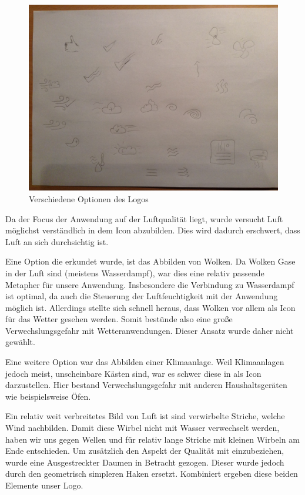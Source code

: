 \documentclass[a4paper,10pt]{article}
\begin{document}
\begin{figure}[!h]
	\centering
	\includegraphics[scale=0.3]{images/sketches1.jpg}
	\caption{Verschiedene Optionen des Logos}
\end{figure}

Da der Focus der Anwendung auf der Luftqualität liegt, wurde versucht Luft möglichst verständlich in dem Icon abzubilden. Dies wird dadurch erschwert, dass Luft an sich durchsichtig ist.

Eine Option die erkundet wurde, ist das Abbilden von Wolken. Da Wolken Gase in der Luft sind (meistens Wasserdampf), war dies eine relativ passende Metapher für unsere Anwendung. Insbesondere die Verbindung zu Wasserdampf ist optimal, da auch die Steuerung der Luftfeuchtigkeit mit der Anwendung möglich ist. Allerdings stellte sich schnell heraus, dass Wolken vor allem als Icon für das Wetter gesehen werden. Somit bestünde also eine große Verwechslungsgefahr mit Wetteranwendungen. Dieser Ansatz wurde daher nicht gewählt.

Eine weitere Option war das Abbilden einer Klimaanlage. Weil Klimaanlagen jedoch meist, unscheinbare Kästen sind, war es schwer diese in als Icon darzustellen. Hier bestand Verwechslungsgefahr mit anderen Haushaltsgeräten wie beispielsweise Öfen.

Ein relativ weit verbreitetes Bild von Luft ist sind verwirbelte Striche, welche Wind nachbilden. Damit diese Wirbel nicht mit Wasser verwechselt werden, haben wir uns gegen Wellen und für relativ lange Striche mit kleinen Wirbeln am Ende entschieden. Um zusätzlich den Aspekt der Qualität mit einzubeziehen, wurde eine Ausgestreckter Daumen in Betracht gezogen. Dieser wurde jedoch durch den geometrisch simpleren Haken ersetzt. Kombiniert ergeben diese beiden Elemente unser Logo.
\end{document}
